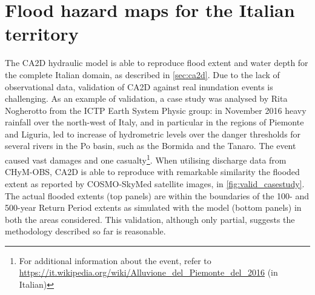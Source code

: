 \section{Flood hazard maps for the Italian territory}\label{sec:results_flood}
The CA2D hydraulic model is able to reproduce flood extent and water depth for the complete Italian domain, as described in \cref{sec:ca2d}.
Due to the lack of observational data, validation of CA2D against real inundation events is challenging.
As an example of validation, a case study was analysed by Rita Nogherotto from the ICTP Earth System Physic group: in November 2016 heavy rainfall over the north-west of Italy, and in particular in the regions of Piemonte and Liguria, led to increase of hydrometric levels over the danger thresholds for several rivers in the Po basin, such as the Bormida and the Tanaro.
The event caused vast damages and one casualty\footnote{For additional information about the event, refer to \url{https://it.wikipedia.org/wiki/Alluvione_del_Piemonte_del_2016} (in Italian)}. 
When utilising discharge data from CHyM-OBS, CA2D is able to reproduce with remarkable similarity the flooded extent as reported by COSMO-SkyMed satellite images, in \cref{fig:valid_casestudy}.
The actual flooded extents (top panels) are within the boundaries of the 100- and 500-year Return Period extents as simulated with the model (bottom panels) in both the areas considered.
This validation, although only partial, suggests the methodology described so far is reasonable.
